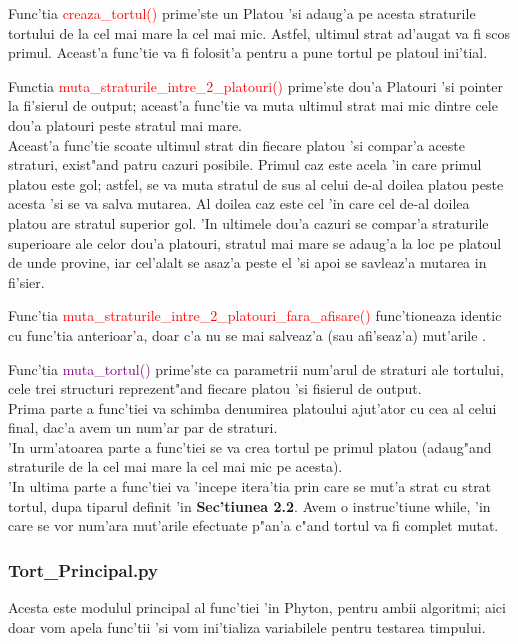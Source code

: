 \documentclass{article}
\begin{document}
Func'tia  \textcolor{red}{creaza\_tortul()} prime'ste un Platou 'si adaug'a pe acesta straturile tortului de la cel mai mare la cel mai mic. Astfel, ultimul strat ad'augat va fi scos primul.
Aceast'a func'tie va fi folosit'a pentru a pune tortul pe platoul ini'tial.

Functia  \textcolor{red}{muta\_straturile\_intre\_2\_platouri()} prime'ste dou'a Platouri 'si pointer la fi'sierul de output; aceast'a func'tie va muta ultimul strat mai mic dintre cele dou'a platouri peste stratul mai mare.\\
Aceast'a func'tie scoate ultimul strat din fiecare platou 'si compar'a aceste straturi, exist"and patru cazuri posibile.
Primul caz este acela 'in care primul platou este gol; astfel, se va muta stratul de sus al celui de-al doilea platou peste acesta 'si se va salva mutarea. Al doilea caz este cel 'in care cel de-al doilea platou are stratul superior gol. 'In ultimele dou'a cazuri se compar'a straturile superioare ale celor dou'a platouri, stratul mai mare se adaug'a la loc pe platoul de unde provine, iar cel'alalt se asaz'a peste el 'si apoi se savleaz'a mutarea in fi'sier.

Func'tia \textcolor{red}{muta\_straturile\_intre\_2\_platouri\_fara\_afisare()} func'tioneaza identic cu func'tia anterioar'a, doar c'a nu se mai salveaz'a (sau afi'seaz'a) mut'arile .

Func'tia \textcolor{purple}{muta\_tortul()} prime'ste ca parametrii num'arul de straturi ale tortului, cele trei structuri reprezent"and fiecare platou 'si fisierul de output.\\
Prima parte a func'tiei va schimba denumirea platoului ajut'ator cu cea al celui final, dac'a avem un num'ar par de straturi.\\
'In urm'atoarea parte a func'tiei se va crea tortul pe primul platou (adaug"and straturile de la cel mai mare la cel mai mic pe acesta).\\
'In ultima parte a func'tiei va 'incepe itera'tia prin care se mut'a strat cu strat tortul, dupa tiparul definit 'in \textbf{Sec'tiunea 2.2}. Avem o instruc'tiune while, 'in care se vor num'ara mut'arile efectuate p"an'a c"and tortul va fi complet mutat.

\subsubsection{Tort\_Principal.py}

Acesta este modulul principal al func'tiei 'in Phyton, pentru ambii algoritmi; aici doar vom apela func'tii 'si vom ini'tializa variabilele pentru testarea timpului.
\end{document}
